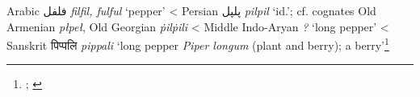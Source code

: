 \begin{etymology}\label{ety:fulful}
Arabic {فلفل} \textit{filfil, fulful} `pepper'
< Persian {پلپل} \textit{pilpil} `id.'; cf. cognates Old Armenian  \textit{płpeł}, Old Georgian  \textit{ṗilṗili}
< Middle Indo-Aryan \textit{?} `long pepper'
< Sanskrit {पिप्पलि } \textit{pippali} `long pepper \textit{Piper longum} (plant and berry); a berry'\footnote{\textcite[2434]{lane_arabic-english_1863}; \textcite{sq}}
\end{etymology}